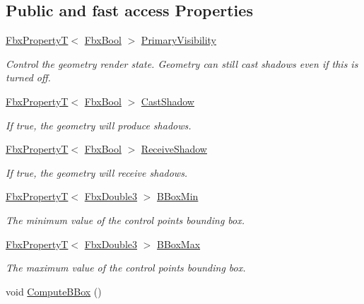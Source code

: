 \subsection*{Public and fast access Properties}
\begin{DoxyCompactItemize}
\item 
\hyperlink{class_fbx_property_t}{Fbx\+PropertyT}$<$ \hyperlink{fbxtypes_8h_a92e0562b2fe33e76a242f498b362262e}{Fbx\+Bool} $>$ \hyperlink{class_fbx_geometry_base_a51e2206786ddb6a94a15be4a8fd9517f}{Primary\+Visibility}
\begin{DoxyCompactList}\small\item\em Control the geometry render state. Geometry can still cast shadows even if this is turned off. \end{DoxyCompactList}\item 
\hyperlink{class_fbx_property_t}{Fbx\+PropertyT}$<$ \hyperlink{fbxtypes_8h_a92e0562b2fe33e76a242f498b362262e}{Fbx\+Bool} $>$ \hyperlink{class_fbx_geometry_base_a64d3184a3bf9bcd97f7069176b0ad4c1}{Cast\+Shadow}
\begin{DoxyCompactList}\small\item\em If true, the geometry will produce shadows. \end{DoxyCompactList}\item 
\hyperlink{class_fbx_property_t}{Fbx\+PropertyT}$<$ \hyperlink{fbxtypes_8h_a92e0562b2fe33e76a242f498b362262e}{Fbx\+Bool} $>$ \hyperlink{class_fbx_geometry_base_a38e79ed34812e8b02828ebb5690f4ce8}{Receive\+Shadow}
\begin{DoxyCompactList}\small\item\em If true, the geometry will receive shadows. \end{DoxyCompactList}\item 
\hyperlink{class_fbx_property_t}{Fbx\+PropertyT}$<$ \hyperlink{fbxtypes_8h_ae0a96f14cde566774c7553aa7523b7a7}{Fbx\+Double3} $>$ \hyperlink{class_fbx_geometry_base_a66d6d410709e83f4f4d0a17651fbb717}{B\+Box\+Min}
\begin{DoxyCompactList}\small\item\em The minimum value of the control points bounding box. \end{DoxyCompactList}\item 
\hyperlink{class_fbx_property_t}{Fbx\+PropertyT}$<$ \hyperlink{fbxtypes_8h_ae0a96f14cde566774c7553aa7523b7a7}{Fbx\+Double3} $>$ \hyperlink{class_fbx_geometry_base_a462c10c0d41fe55413e41435e62128c9}{B\+Box\+Max}
\begin{DoxyCompactList}\small\item\em The maximum value of the control points bounding box. \end{DoxyCompactList}\item 
void \hyperlink{class_fbx_geometry_base_a6c27b53ff81cdcbe4f6da4b1acfd4375}{Compute\+B\+Box} ()
\end{DoxyCompactItemize}
